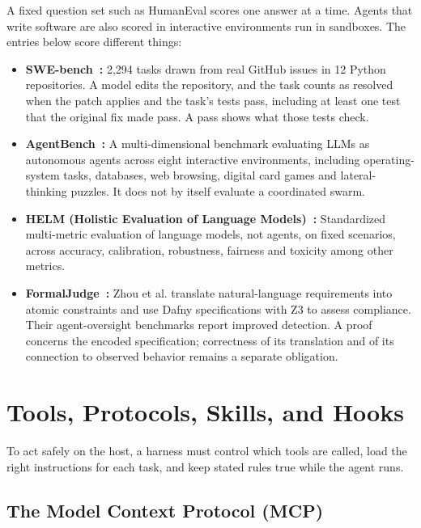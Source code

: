 A fixed question set such as HumanEval scores one answer at a time. Agents that write software are also scored in interactive environments run in sandboxes. The entries below score different things:
\begin{itemize}[leftmargin=1.8em,itemsep=2pt]
  \item \textbf{SWE-bench~:} 2,294 tasks drawn from real GitHub issues in 12 Python repositories. A model edits the repository, and the task counts as resolved when the patch applies and the task's tests pass, including at least one test that the original fix made pass. A pass shows what those tests check.
  \item \textbf{AgentBench~:} A multi-dimensional benchmark evaluating LLMs as autonomous agents across eight interactive environments, including operating-system tasks, databases, web browsing, digital card games and lateral-thinking puzzles. It does not by itself evaluate a coordinated swarm.
  \item \textbf{HELM (Holistic Evaluation of Language Models)~:} Standardized multi-metric evaluation of language models, not agents, on fixed scenarios, across accuracy, calibration, robustness, fairness and toxicity among other metrics.
  \item \textbf{FormalJudge~:} Zhou et al. translate natural-language requirements into atomic constraints and use Dafny specifications with Z3 to assess compliance. Their agent-oversight benchmarks report improved detection. A proof concerns the encoded specification; correctness of its translation and of its connection to observed behavior remains a separate obligation.
\end{itemize}

\section{Tools, Protocols, Skills, and Hooks}\label{sec:prereq-hypervisors}

To act safely on the host, a harness must control which tools are called, load the right instructions for each task, and keep stated rules true while the agent runs.

\subsection{The Model Context Protocol (MCP)}

